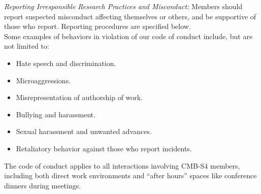 \documentclass[12pt]{article}
\newcommand{\todo}[1]{\textcolor{red}{(TODO: #1)}}
\begin{document}
{\it Reporting Irresponsible Research Practices and Misconduct:}  Members should report suspected misconduct affecting themselves or others, and be supportive of those who report.  Reporting procedures are specified below.\\


Some examples of behaviors in violation of our code of conduct include, but are not limited to:

\begin{itemize}

\item Hate speech and discrimination. %

\item Microaggressions. %

\item Misrepresentation of authorship of work.

\item Bullying and harassment. %

\item Sexual harassment and unwanted advances. %

\item Retaliatory behavior against those who report incidents.%
\end{itemize}

The code of conduct applies to all interactions involving CMB-S4 members, including both direct work environments and ``after hours'' spaces like conference dinners during meetings.
\end{document}
